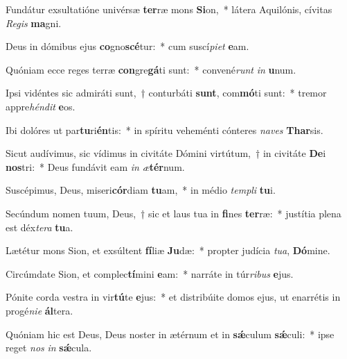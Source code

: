 \item Fundátur exsultatióne univérsæ \textbf{ter}ræ mons \textbf{Si}on,~* látera Aquilónis, cívitas \textit{Re}\textit{gis} \textbf{ma}gni.
\item Deus in dómibus ejus \textbf{co}gno\textbf{scé}tur:~* cum suscí\textit{pi}\textit{et} \textbf{e}am.
\item Quóniam ecce reges terræ \textbf{con}gre\textbf{gá}ti sunt:~* convené\textit{runt} \textit{in} \textbf{u}num.
\item Ipsi vidéntes sic admiráti sunt,~† conturbáti \textbf{sunt}, com\textbf{mó}ti sunt:~* tremor appre\textit{hén}\textit{dit} \textbf{e}os.
\item Ibi dolóres ut par\textbf{tu}ri\textbf{én}tis:~* in spíritu veheménti cónteres \textit{na}\textit{ves} \textbf{Thar}sis.
\item Sicut audívimus, sic vídimus in civitáte Dómini virtútum,~† in civitáte \textbf{De}i \textbf{nos}tri:~* Deus fundávit eam \textit{in} \textit{æ}\textbf{tér}num.
\item Suscépimus, Deus, miseri\textbf{cór}diam \textbf{tu}am,~* in médio \textit{tem}\textit{pli} \textbf{tu}i.
\item Secúndum nomen tuum, Deus,~† sic et laus tua in \textbf{fi}nes \textbf{ter}ræ:~* justítia plena est déx\textit{te}\textit{ra} \textbf{tu}a.
\item Lætétur mons Sion, et exsúltent \textbf{fí}liæ \textbf{Ju}dæ:~* propter judícia \textit{tu}\textit{a}, \textbf{Dó}mine.
\item Circúmdate Sion, et complec\textbf{tí}mini \textbf{e}am:~* narráte in túr\textit{ri}\textit{bus} \textbf{e}jus.
\item Pónite corda vestra in vir\textbf{tú}te \textbf{e}jus:~* et distribúite domos ejus, ut enarrétis in progé\textit{ni}\textit{e} \textbf{ál}tera.
\item Quóniam hic est Deus, Deus noster in ætérnum et in \textbf{sǽ}culum \textbf{sǽ}culi:~* ipse reget \textit{nos} \textit{in} \textbf{sǽ}cula.
